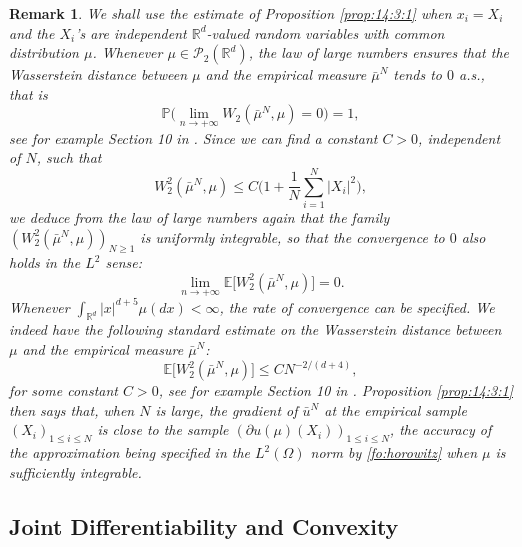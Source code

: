 \documentclass[11pt]{amsart}
\newtheorem{remark}[theorem]{Remark}
\begin{document}
\begin{remark}
\label{re:convergence}
We shall use the estimate of Proposition \ref{prop:14:3:1} when $x_i=X_i$ and the $X_i$'s are independent ${\mathbb R}^d$-valued random variables with common distribution $\mu$. Whenever $\mu \in {\mathcal P}_{2}({\mathbb R}^d)$, the law of large numbers ensures that the Wasserstein distance between $\mu$ and the empirical measure $\bar{\mu}^N$ tends to $0$ a.s., that is 
\begin{equation*}
{\mathbb P} \bigl( \lim_{n \rightarrow + \infty} W_{2}(\bar{\mu}^N,\mu) = 0 \bigr) = 1, 
\end{equation*}
see for example Section 10 in \cite{RachevRuschendorf}. Since we can find a constant $C >0$, independent of $N$, such that 
\begin{equation*}
W_{2}^2(\bar{\mu}^N,\mu) \leq C \bigl( 1 + \frac{1}{N} \sum_{i=1}^N \vert X_{i} \vert^2 \bigr),
\end{equation*}
we deduce from the law of large numbers again that the family $(W_{2}^2(\bar{\mu}^N,\mu))_{N \geq 1}$ is uniformly integrable, so that the convergence to $0$ also holds in the $L^2$ sense:
\begin{equation}
\label{fo:wassertsein empirical}
\lim_{n \rightarrow + \infty} {\mathbb E} \bigl[ W_{2}^2(\bar{\mu}^N,\mu) \bigr] = 0.  
\end{equation}
Whenever $\int_{{\mathbb R}^d}|x|^{d+5}\mu(dx)<\infty$, the rate of convergence can be specified. We indeed have the following standard estimate on the Wasserstein distance between $\mu$ and the empirical measure $\bar{\mu}^N$: 
\begin{equation}
\label{fo:horowitz}
{\mathbb E} \bigl[ W^2_{2}(\bar{\mu}^N,\mu) \bigr] \leq C N^{-2/(d+4)},
\end{equation}
for some constant $C>0$, 
see for example Section 10 in \cite{RachevRuschendorf}. 
Proposition \ref{prop:14:3:1} then says that, when $N$ is large, the gradient of $\bar{u}^N$ at the empirical sample $(X_{i})_{1 \leq i \leq N}$ is close to the sample 
$(\partial u(\mu)(X_{i}))_{1 \leq i \leq N}$, the accuracy of the approximation being specified in the $L^2({\Omega})$ norm by \eqref{fo:horowitz} when $\mu$ is sufficiently integrable.
\end{remark}

\subsection{Joint Differentiability and Convexity}
\label{subse:joint}
{\ }
\end{document}
